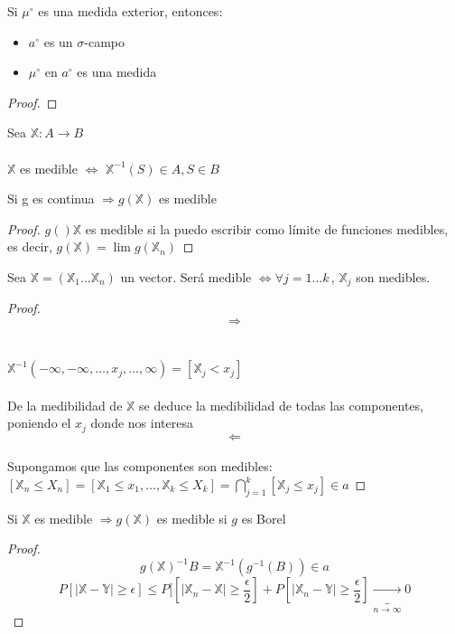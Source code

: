 \documentclass[12pt,a4paper]{book}
\begin{document}
\begin{theorem}
Si $\mu^\circ$ es una medida exterior, entonces:
\begin{itemize}
\item $a^\circ$ es un $\sigma$-campo
\item $\mu^\circ$ en $a^\circ$ es una medida
\end{itemize}
\end{theorem}
\begin{proof}

\end{proof}
\begin{lemma}
Sea $\mathbb{X}:A\longrightarrow B$\\\\
$\mathbb{X}$ es medible $\Longleftrightarrow$ $\mathbb{X}^{-1}(S)\in A,S \in B$
\end{lemma}
\begin{theorem}
Si g es continua $\Longrightarrow  g(\mathbb{X})$ es medible
\end{theorem}
\begin{proof}
$g()\mathbb{X}$ es medible si la puedo escribir como límite de funciones medibles, es decir, $g(\mathbb{X})=\displaystyle\lim g(\mathbb{X}_n)$
\end{proof}
\begin{theorem}
Sea $\mathbb{X}=(\mathbb{X}_1\ldots \mathbb{X}_n)$ un vector. Será medible $\Longleftrightarrow \forall j=1\ldots k\, , \, \mathbb{X}_j$ son medibles.
\end{theorem}
\begin{proof}
$$\Longrightarrow$$
\\\\
$\mathbb{X}^{-1}(-\infty,-\infty,\ldots ,x_j,\ldots ,\infty)=[\mathbb{X}_j < x_j]$\\\\
De la medibilidad de $\mathbb{X}$ se deduce la medibilidad de todas las componentes, poniendo el $x_j$ donde nos interesa\\
$$\Longleftarrow$$
\\
Supongamos que las componentes son medibles:\\
$[\mathbb{X}_n \leq X_n]=[\mathbb{X}_1\leq x_1,\ldots ,\mathbb{X}_k \leq X_k]=\bigcap_{j=1}^k{[\mathbb{X}_j\leq x_j]}\in a$
\end{proof}
\begin{theorem}
Si $\mathbb{X}$ es medible $\Longrightarrow g(\mathbb{X})$ es medible si $g$ es Borel
\end{theorem}
\begin{proof}
$$g(\mathbb{X})^{-1}B=\mathbb{X}^{-1}(g^{-1}(B))\in a$$
$$P[|\mathbb{X}-\mathbb{Y}|\geq \epsilon]\leq P[[|\mathbb{X}_n-\mathbb{X}|\geq \dfrac{\epsilon}{2}]+P[|\mathbb{X}_n-\mathbb{Y}|\geq \dfrac{\epsilon}{2}]\underbrace{\longrightarrow}_{n\rightarrow\infty}0$$
\end{proof}
\end{document}
